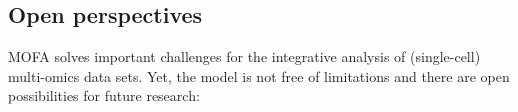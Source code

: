 


\newpage

\subsection{Open perspectives}

MOFA solves important challenges for the integrative analysis of (single-cell) multi-omics data sets. Yet, the model is not free of limitations and there are open possibilities for future research:

